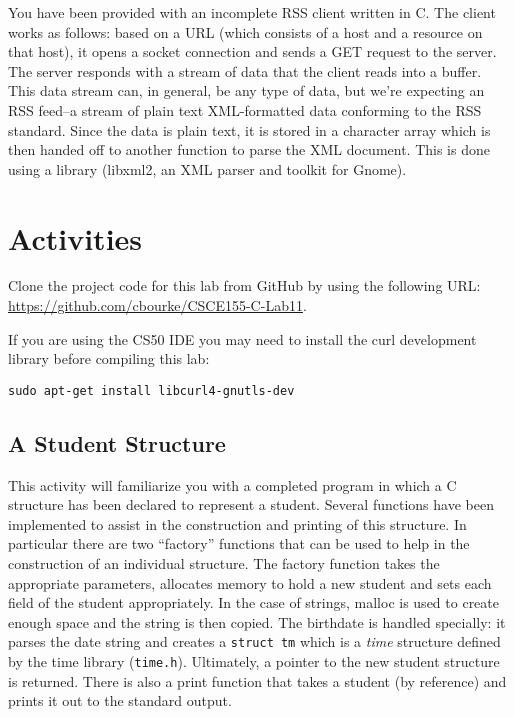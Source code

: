 \documentclass[12pt]{scrartcl}
\begin{document}
You have been provided with an incomplete RSS client written in C.  
The client works as follows: based on a URL (which consists of a 
host and a resource on that host), it opens a socket connection and 
sends a GET request to the server.  The server responds with a 
stream of data that the client reads into a buffer.  This data stream 
can, in general, be any type of data, but we're expecting an RSS 
feed--a stream of plain text XML-formatted data conforming to the 
RSS standard.  Since the data is plain text, it is stored in a 
character array which is then handed off to another function 
to parse the XML document.  This is done using a library (libxml2, 
an XML parser and toolkit for Gnome).

\section{Activities}

Clone the project code for this lab from GitHub by using the following URL:
\url{https://github.com/cbourke/CSCE155-C-Lab11}.

If you are using the CS50 IDE you may need to install the curl development
library before compiling this lab:

\texttt{sudo apt-get install libcurl4-gnutls-dev}

\subsection{A Student Structure}

This activity will familiarize you with a completed program in which 
a C structure has been declared to represent a student.  Several 
functions have been implemented to assist in the construction and 
printing of this structure.  In particular there are two ``factory'' 
functions that can be used to help in the construction of an individual 
structure.  The factory function takes the appropriate parameters, 
allocates memory to hold a new student and sets each field of the 
student appropriately.  In the case of strings, malloc is used to create 
enough space and the string is then copied.  The birthdate is handled 
specially: it parses the date string and creates a \texttt{struct tm} 
which is a \emph{time} structure defined by the time library 
(\texttt{time.h}).  Ultimately, a pointer to the new student 
structure is returned.  There is also a print function that takes a 
student (by reference) and prints it out to the standard output.
\end{document}
